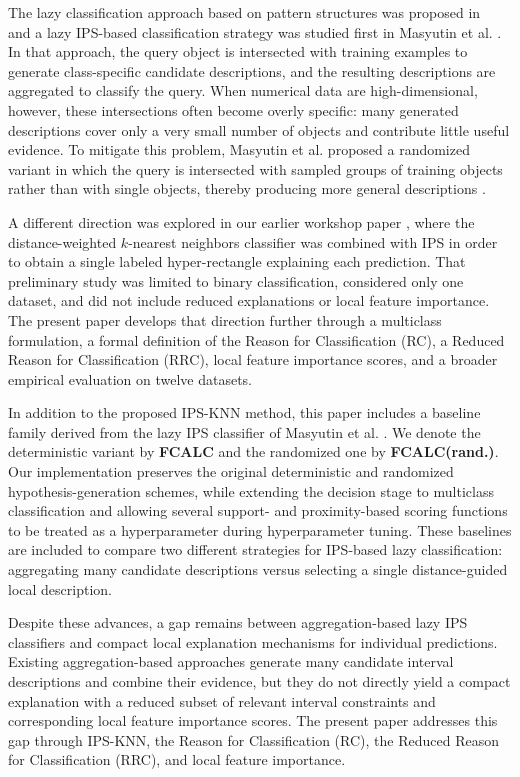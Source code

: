 \documentclass[a4paper,fleqn]{cas-sc}
\begin{document}
The lazy classification approach based on pattern structures was proposed in~\cite{kuznetsov2013fitting, kuznetsov2013scalable} and a lazy IPS-based classification strategy was studied first in Masyutin et al. \cite{masyutin2015lazy}. In that approach, the query object is intersected with training examples to generate class-specific candidate descriptions, and the resulting descriptions are aggregated to classify the query. When numerical data are high-dimensional, however, these intersections often become overly specific: many generated descriptions cover only a very small number of objects and contribute little useful evidence. To mitigate this problem, Masyutin et al. proposed a randomized variant in which the query is intersected with sampled groups of training objects rather than with single objects, thereby producing more general descriptions \cite{masyutin2015lazy, semenkov2021ensemble}.

A different direction was explored in our earlier workshop paper \cite{tomat2023interval}, where the distance-weighted \(k\)-nearest neighbors classifier was combined with IPS in order to obtain a single labeled hyper-rectangle explaining each prediction. That preliminary study was limited to binary classification, considered only one dataset, and did not include reduced explanations or local feature importance. The present paper develops that direction further through a multiclass formulation, a formal definition of the Reason for Classification (RC), a Reduced Reason for Classification (RRC), local feature importance scores, and a broader empirical evaluation on twelve datasets.

In addition to the proposed IPS-KNN method, this paper includes a baseline family derived from the lazy IPS classifier of Masyutin et al. \cite{masyutin2015lazy}. We denote the deterministic variant by \textbf{FCALC} and the randomized one by \textbf{FCALC(rand.)}. Our implementation preserves the original deterministic and randomized hypothesis-generation schemes, while extending the decision stage to multiclass classification and allowing several support- and proximity-based scoring functions to be treated as a hyperparameter during hyperparameter tuning. These baselines are included to compare two different strategies for IPS-based lazy classification: aggregating many candidate descriptions versus selecting a single distance-guided local description.

Despite these advances, a gap remains between aggregation-based lazy IPS classifiers and compact local explanation mechanisms for individual predictions. Existing aggregation-based approaches generate many candidate interval descriptions and combine their evidence, but they do not directly yield a compact explanation with a reduced subset of relevant interval constraints and corresponding local feature importance scores. The present paper addresses this gap through IPS-KNN, the Reason for Classification (RC), the Reduced Reason for Classification (RRC), and local feature importance.
\end{document}
